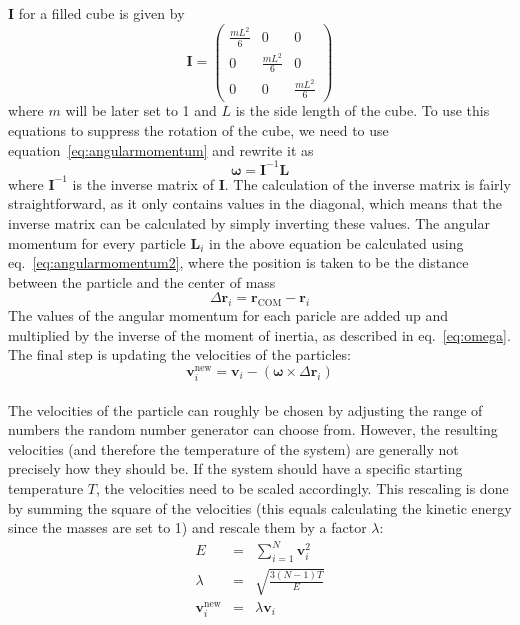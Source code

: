 \documentclass[12pt]{article}
\begin{document}
$\mathbf{I}$ for a filled cube is given by 
\begin{equation}
    \mathbf{I} = 
    \begin{pmatrix}
        \frac{mL^2}{6} & 0 & 0\\
        0 & \frac{mL^2}{6} & 0\\
        0 & 0 & \frac{mL^2}{6} 
    \end{pmatrix}
\end{equation}
where $m$ will be later set to 1 and $L$ is the side length of the cube. To use this equations to suppress the rotation of the cube, we need to use
equation~\eqref{eq:angularmomentum} and rewrite it as
\begin{equation}
    \label{eq:omega}
    \boldsymbol{\omega} = \mathbf{I}^{-1}\mathbf{L}
\end{equation}
where $\mathbf{I}^{-1}$ is the inverse matrix of $\mathbf{I}$. The calculation of the inverse matrix is fairly straightforward, as it only contains
values in the diagonal, which means that the inverse matrix can be calculated by simply inverting these values. The angular momentum for every
particle $\mathbf{L}_i$ in the above equation be calculated using eq.~\eqref{eq:angularmomentum2}, where the position is taken to be the distance
between the particle and the center of mass
\begin{equation}
    \Delta\mathbf{r}_i = \mathbf{r}_\text{COM} - \mathbf{r}_i
\end{equation}
The values of the angular momentum for each paricle are added up and multiplied by the inverse of the moment of inertia, as described in
eq.~\eqref{eq:omega}. The final step is updating the velocities of the particles:
\begin{equation}
    \mathbf{v}_i^\text{new} = \mathbf{v}_i - \left(\boldsymbol{\omega} \times \Delta\mathbf{r}_i\right)
\end{equation}
\\The velocities of the particle can roughly be chosen by adjusting the range of numbers the random number generator can choose from. However, the
resulting velocities (and therefore the temperature of the system) are generally not precisely how they should be. If the system should have a
specific starting temperature $T$, the velocities need to be scaled accordingly. This rescaling is done by summing the square of the velocities
(this equals calculating the kinetic energy since the masses are set to 1) and rescale them by a factor $\lambda$:
\begin{eqnarray}
 \label{eq:rescale1}   E &=& \sum_{i=1}^N \mathbf{v}_i^2 \\
 \label{eq:rescale2}   \lambda &=& \sqrt{\frac{3(N-1)T}{E}} \\
 \label{eq:rescale3}   \mathbf{v}_i^\text{new} &=& \lambda \mathbf{v}_i  
\end{eqnarray}
\end{document}
